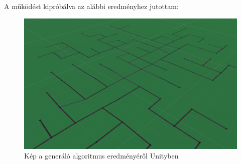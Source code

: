 A működést kipróbálva az alábbi eredményhez jutottam:
\begin{figure}[H]
\includegraphics[width=\linewidth]{unitygraph.png}
\caption{Kép a generáló algoritmus eredményéről Unityben}
\label{fig:ugraph}
\end{figure}
